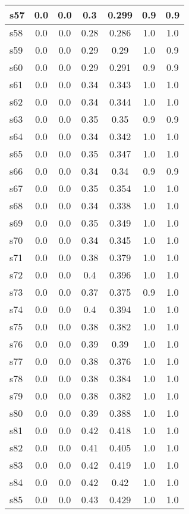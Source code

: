\documentclass{article}
\begin{document}
\begin{tabular}{|l|c|c|c|c|c|c|}
\hline
s57 &0.0 & 0.0 & 0.3 & 0.299 & 0.9 & 0.9\\
\hline
s58 &0.0 & 0.0 & 0.28 & 0.286 & 1.0 & 1.0\\
\hline
s59 &0.0 & 0.0 & 0.29 & 0.29 & 1.0 & 0.9\\
\hline
s60 &0.0 & 0.0 & 0.29 & 0.291 & 0.9 & 0.9\\
\hline
s61 &0.0 & 0.0 & 0.34 & 0.343 & 1.0 & 1.0\\
\hline
s62 &0.0 & 0.0 & 0.34 & 0.344 & 1.0 & 1.0\\
\hline
s63 &0.0 & 0.0 & 0.35 & 0.35 & 0.9 & 0.9\\
\hline
s64 &0.0 & 0.0 & 0.34 & 0.342 & 1.0 & 1.0\\
\hline
s65 &0.0 & 0.0 & 0.35 & 0.347 & 1.0 & 1.0\\
\hline
s66 &0.0 & 0.0 & 0.34 & 0.34 & 0.9 & 0.9\\
\hline
s67 &0.0 & 0.0 & 0.35 & 0.354 & 1.0 & 1.0\\
\hline
s68 &0.0 & 0.0 & 0.34 & 0.338 & 1.0 & 1.0\\
\hline
s69 &0.0 & 0.0 & 0.35 & 0.349 & 1.0 & 1.0\\
\hline
s70 &0.0 & 0.0 & 0.34 & 0.345 & 1.0 & 1.0\\
\hline
s71 &0.0 & 0.0 & 0.38 & 0.379 & 1.0 & 1.0\\
\hline
s72 &0.0 & 0.0 & 0.4 & 0.396 & 1.0 & 1.0\\
\hline
s73 &0.0 & 0.0 & 0.37 & 0.375 & 0.9 & 1.0\\
\hline
s74 &0.0 & 0.0 & 0.4 & 0.394 & 1.0 & 1.0\\
\hline
s75 &0.0 & 0.0 & 0.38 & 0.382 & 1.0 & 1.0\\
\hline
s76 &0.0 & 0.0 & 0.39 & 0.39 & 1.0 & 1.0\\
\hline
s77 &0.0 & 0.0 & 0.38 & 0.376 & 1.0 & 1.0\\
\hline
s78 &0.0 & 0.0 & 0.38 & 0.384 & 1.0 & 1.0\\
\hline
s79 &0.0 & 0.0 & 0.38 & 0.382 & 1.0 & 1.0\\
\hline
s80 &0.0 & 0.0 & 0.39 & 0.388 & 1.0 & 1.0\\
\hline
s81 &0.0 & 0.0 & 0.42 & 0.418 & 1.0 & 1.0\\
\hline
s82 &0.0 & 0.0 & 0.41 & 0.405 & 1.0 & 1.0\\
\hline
s83 &0.0 & 0.0 & 0.42 & 0.419 & 1.0 & 1.0\\
\hline
s84 &0.0 & 0.0 & 0.42 & 0.42 & 1.0 & 1.0\\
\hline
s85 &0.0 & 0.0 & 0.43 & 0.429 & 1.0 & 1.0\\

\end{tabular}
\end{document}
